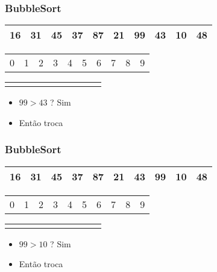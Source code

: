 \documentclass{beamer}
\begin{document}
\begin{frame}
    \frametitle{BubbleSort}
    \begin{center}
        \begin{table}
            \begin{tabular}{| p{0.25cm} | p{0.25cm} | p{0.25cm} | p{0.25cm} | p{0.25cm} | p{0.25cm} | p{0.25cm} | p{0.25cm} | p{0.25cm} | p{0.25cm} |}
                \hline
                16 & 31 & 45 & 37 & 87 & 21 & 99 & 43 & 10 & 48 \\ \hline
            \end{tabular}
            \begin{tabular}{p{0.25cm} p{0.25cm} p{0.25cm} p{0.25cm} p{0.25cm} p{0.25cm} p{0.25cm} p{0.25cm} p{0.25cm} p{0.25cm}}
                0 & 1 & 2 & 3 & 4 & 5 & 6 & 7 & 8 & 9
            \end{tabular}
            \begin{tabular}{p{0.25cm} p{0.25cm} p{0.25cm} p{0.25cm} p{0.25cm} p{0.25cm} p{0.25cm} p{0.25cm} p{0.25cm} p{0.25cm}}
                & & & & & & \color{red}{$\uparrow$} & \color{blue}{$\uparrow$} & &
            \end{tabular}
        \end{table}
	\end{center}
    \begin{itemize}[<+->]
        \item $99 > 43$ ? Sim
        \item Então troca
    \end{itemize}
\end{frame}

\begin{frame}
    \frametitle{BubbleSort}
    \begin{center}
        \begin{table}
            \begin{tabular}{| p{0.25cm} | p{0.25cm} | p{0.25cm} | p{0.25cm} | p{0.25cm} | p{0.25cm} | p{0.25cm} | p{0.25cm} | p{0.25cm} | p{0.25cm} |}
                \hline
                16 & 31 & 45 & 37 & 87 & 21 & 43 & 99 & 10 & 48 \\ \hline
            \end{tabular}
            \begin{tabular}{p{0.25cm} p{0.25cm} p{0.25cm} p{0.25cm} p{0.25cm} p{0.25cm} p{0.25cm} p{0.25cm} p{0.25cm} p{0.25cm}}
                0 & 1 & 2 & 3 & 4 & 5 & 6 & 7 & 8 & 9
            \end{tabular}
            \begin{tabular}{p{0.25cm} p{0.25cm} p{0.25cm} p{0.25cm} p{0.25cm} p{0.25cm} p{0.25cm} p{0.25cm} p{0.25cm} p{0.25cm}}
                & & & & & & & \color{blue}{$\uparrow$} & \color{red}{$\uparrow$} &
            \end{tabular}
        \end{table}
	\end{center}
    \begin{itemize}[<+->]
        \item $99 > 10$ ? Sim
        \item Então troca
    \end{itemize}
\end{frame}
\end{document}
